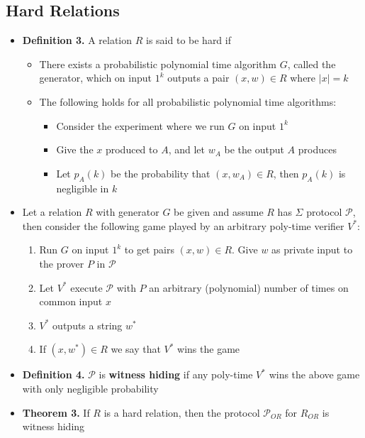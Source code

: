 \subsection{Hard Relations}
\begin{itemize}
  \item \textbf{Definition 3.} A relation $R$ is said to be hard if
  \begin{itemize}
  	\item There exists a probabilistic polynomial time algorithm $G$, called the generator, which on input $1^k$ outputs a pair $(x,w) \in R$ where $|x| = k$
  	\item The following holds for all probabilistic polynomial time algorithms:
    \begin{itemize}
  		\item Consider the experiment where we run $G$ on input $1^k$
  		\item Give the $x$ produced to $A$, and let $w_A$ be the output $A$ produces
  		\item Let $p_A(k)$ be the probability that $(x,w_A) \in R$, then $p_{A}(k)$ is negligible in $k$
    \end{itemize}
  \end{itemize}

  \item Let a relation $R$ with generator $G$ be given and assume $R$ has $\Sigma$ protocol $\mathcal P$, then consider the following game played by an arbitrary poly-time verifier $V^*$:
  \begin{enumerate}
  	\item Run $G$ on input $1^k$ to get pairs $(x,w) \in R$. Give $w$ as private input to the prover $P$ in $\mathcal P$
  	\item Let $V^*$ execute $\mathcal P$ with $P$ an arbitrary (polynomial) number of times on common input $x$
  	\item $V^*$ outputs a string $w^*$
  	\item If $(x,w^*) \in R$ we say that $V^*$ wins the game
  \end{enumerate}
  \item \textbf{Definition 4.} $\mathcal P$ is \textbf{witness hiding} if any poly-time $V^*$ wins the above game with only negligible probability

  \item \textbf{Theorem 3.} If $R$ is a hard relation, then the protocol $\mathcal P_{OR}$ for $R_{OR}$ is witness hiding
\end{itemize}

